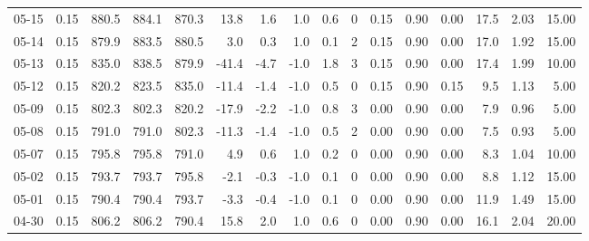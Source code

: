 \begin{threeparttable}
{\begin{tabular}{lrrrrrrrrrrrrrrr}
  05-15 &     0.15 & 880.5 & 884.1 & 870.3 &       13.8 &            1.6 &                      1.0 &                 0.6 &              0 &       0.15 &      0.90 &           0.00 &             17.5 &            2.03 &                  15.00 \\
  05-14 &     0.15 & 879.9 & 883.5 & 880.5 &        3.0 &            0.3 &                      1.0 &                 0.1 &              2 &       0.15 &      0.90 &           0.00 &             17.0 &            1.92 &                  15.00 \\
  05-13 &     0.15 & 835.0 & 838.5 & 879.9 &      -41.4 &           -4.7 &                     -1.0 &                 1.8 &              3 &       0.15 &      0.90 &           0.00 &             17.4 &            1.99 &                  10.00 \\
  05-12 &     0.15 & 820.2 & 823.5 & 835.0 &      -11.4 &           -1.4 &                     -1.0 &                 0.5 &              0 &       0.15 &      0.90 &           0.15 &              9.5 &            1.13 &                   5.00 \\
  05-09 &     0.15 & 802.3 & 802.3 & 820.2 &      -17.9 &           -2.2 &                     -1.0 &                 0.8 &              3 &       0.00 &      0.90 &           0.00 &              7.9 &            0.96 &                   5.00 \\
  05-08 &     0.15 & 791.0 & 791.0 & 802.3 &      -11.3 &           -1.4 &                     -1.0 &                 0.5 &              2 &       0.00 &      0.90 &           0.00 &              7.5 &            0.93 &                   5.00 \\
  05-07 &     0.15 & 795.8 & 795.8 & 791.0 &        4.9 &            0.6 &                      1.0 &                 0.2 &              0 &       0.00 &      0.90 &           0.00 &              8.3 &            1.04 &                  10.00 \\
  05-02 &     0.15 & 793.7 & 793.7 & 795.8 &       -2.1 &           -0.3 &                     -1.0 &                 0.1 &              0 &       0.00 &      0.90 &           0.00 &              8.8 &            1.12 &                  15.00 \\
  05-01 &     0.15 & 790.4 & 790.4 & 793.7 &       -3.3 &           -0.4 &                     -1.0 &                 0.1 &              0 &       0.00 &      0.90 &           0.00 &             11.9 &            1.49 &                  15.00 \\
  04-30 &     0.15 & 806.2 & 806.2 & 790.4 &       15.8 &            2.0 &                      1.0 &                 0.6 &              0 &       0.00 &      0.90 &           0.00 &             16.1 &            2.04 &                  20.00 \\

\end{tabular}}
\end{threeparttable}
